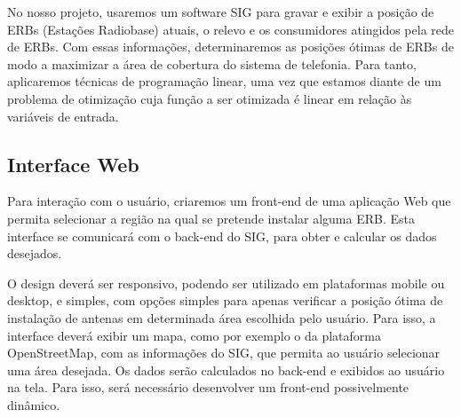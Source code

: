 \documentclass[12pt,a4paper]{article}
\begin{document}
No nosso projeto, usaremos um software SIG para gravar e exibir a posição de
ERBs (Estações Radiobase) atuais, o relevo e os consumidores atingidos pela
rede de ERBs. Com essas informações, determinaremos as posições ótimas de
ERBs de modo a maximizar a área de cobertura do sistema de telefonia.
Para tanto, aplicaremos técnicas de programação linear, uma vez que
estamos diante de um problema de otimização cuja função a ser otimizada
é linear em relação às variáveis de entrada.

\subsection{Interface Web}
Para interação com o usuário, criaremos um front-end de uma aplicação Web que
permita selecionar a região na qual se pretende instalar alguma ERB.
Esta interface se comunicará com o back-end do SIG, para obter e calcular os
dados desejados.

O design deverá ser responsivo, podendo ser utilizado em plataformas mobile
ou desktop, e simples, com opções simples para apenas verificar a posição ótima
de instalação de antenas em determinada área escolhida pelo usuário. Para isso,
a interface deverá exibir um mapa, como por exemplo o da plataforma
OpenStreetMap, com as informações do SIG, que permita ao usuário selecionar uma
área desejada. Os dados serão calculados no back-end e exibidos ao usuário na
tela. Para isso, será necessário desenvolver um front-end possivelmente
dinâmico.
\end{document}
